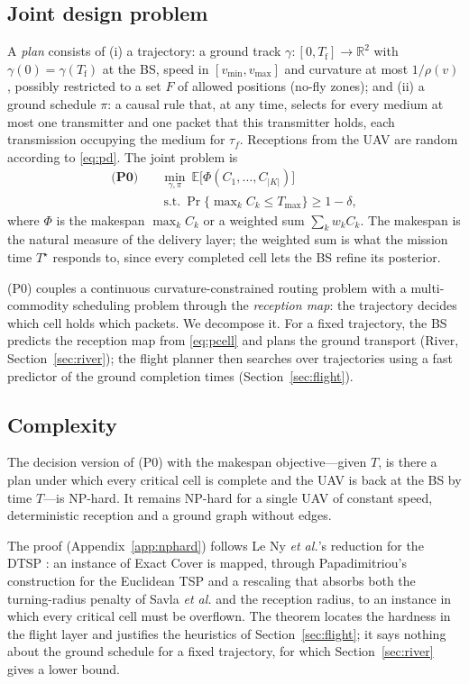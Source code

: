 \subsection{Joint design problem}
A \emph{plan} consists of (i) a trajectory: a ground track $\gamma:[0,T_{\mathrm f}]\to\mathbb{R}^2$ with
$\gamma(0)=\gamma(T_{\mathrm f})$ at the BS, speed in $[v_{\min},v_{\max}]$ and curvature at most $1/\rho(v)$, possibly
restricted to a set $F$ of allowed positions (no-fly zones); and (ii) a ground schedule $\pi$: a causal rule that, at any
time, selects for every medium at most one transmitter and one packet that this transmitter holds, each transmission
occupying the medium for $\tau_f$. Receptions from the UAV are random according to \eqref{eq:pd}. The joint problem is
\begin{equation}
\begin{aligned}
\textbf{(P0)}\quad &\min_{\gamma,\pi}\ \mathbb{E}\bigl[\Phi(C_1,\dots,C_{|K|})\bigr]\\
&\ \text{s.t.}\ \Pr\bigl\{\max\nolimits_k C_k\le T_{\max}\bigr\}\ge 1-\delta ,
\end{aligned}\label{eq:p0}
\end{equation}
where $\Phi$ is the makespan $\max_k C_k$ or a weighted sum $\sum_k w_kC_k$. The makespan is the natural measure of the
delivery layer; the weighted sum is what the mission time $T^\star$ responds to, since every completed cell lets the BS
refine its posterior.

(P0) couples a continuous curvature-constrained routing problem with a multi-commodity scheduling problem through the
\emph{reception map}: the trajectory decides which cell holds which packets. We decompose it. For a fixed trajectory,
the BS predicts the reception map from \eqref{eq:pcell} and plans the ground transport (River, Section~\ref{sec:river});
the flight planner then searches over trajectories using a fast predictor of the ground completion times
(Section~\ref{sec:flight}).

\subsection{Complexity}
\begin{theorem}\label{thm:nphard}
The decision version of (P0) with the makespan objective---given $T$, is there a plan under which every critical cell is
complete and the UAV is back at the BS by time $T$---is NP-hard. It remains NP-hard for a single UAV of constant speed,
deterministic reception and a ground graph without edges.
\end{theorem}
The proof (Appendix~\ref{app:nphard}) follows Le Ny \emph{et al.}'s reduction for the DTSP \cite{leny2012}: an instance
of Exact Cover is mapped, through Papadimitriou's construction for the Euclidean TSP \cite{papadimitriou1977} and a
rescaling that absorbs both the turning-radius penalty of Savla \emph{et al.} \cite{savla2008} and the reception radius,
to an instance in which every critical cell must be overflown. The theorem locates the hardness in the flight layer and
justifies the heuristics of Section~\ref{sec:flight}; it says nothing about the ground schedule for a fixed trajectory,
for which Section~\ref{sec:river} gives a lower bound.
